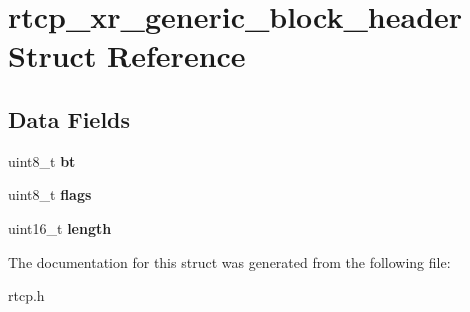 \section{rtcp\+\_\+xr\+\_\+generic\+\_\+block\+\_\+header Struct Reference}
\label{structrtcp__xr__generic__block__header}
\subsection*{Data Fields}
\begin{DoxyCompactItemize}
\item 
\mbox{\label{structrtcp__xr__generic__block__header_a4a1c38e2fa9f4ab9099ce286cc33a54d}} 
uint8\+\_\+t {\bfseries bt}
\item 
\mbox{\label{structrtcp__xr__generic__block__header_a1711cc25f21503d0787dbccef5a4d2fe}} 
uint8\+\_\+t {\bfseries flags}
\item 
\mbox{\label{structrtcp__xr__generic__block__header_afac454caa0c50d83d36028d9d6e9b692}} 
uint16\+\_\+t {\bfseries length}
\end{DoxyCompactItemize}


The documentation for this struct was generated from the following file\+:\begin{DoxyCompactItemize}
\item 
rtcp.\+h\end{DoxyCompactItemize}
